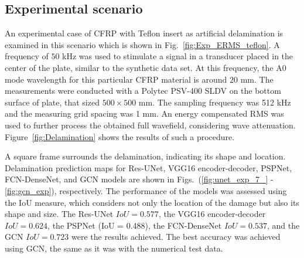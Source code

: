 \subsection{Experimental scenario}
An experimental case of CFRP with Teflon insert as artificial delamination is examined in this scenario which is shown in Fig.~\ref{fig:Exp_ERMS_teflon}.
A frequency of \(50\) kHz was used to stimulate a signal in a transducer placed in the center of the plate, similar to the synthetic data set.
At this frequency, the A0 mode wavelength for this particular CFRP material is around \(20\) mm.
The measurements were conducted with a Polytec PSV-400 SLDV on the bottom surface of plate, that sized \(500 \times 500\) mm.
The sampling frequency was 512 kHz and the measuring grid spacing was 1 mm.
An energy compensated RMS was used to further process the obtained full wavefield, considering wave attenuation.
Figure~\ref{fig:Delamination} shows the results of such a procedure.

A square frame surrounds the delamination, indicating its shape and location.
Delamination prediction maps for Res-UNet, VGG16 encoder-decoder, PSPNet, FCN-DenseNet, and GCN models are shown in Figs.~(\ref{fig:unet_exp_7_} - \ref{fig:gcn_exp}), respectively.
The performance of the models was assessed using the IoU measure, which considers not only the location of the damage but also its shape and size.
The Res-UNet \(IoU = 0.577\), the VGG16 encoder-decoder \(IoU = 0.624\), the PSPNet (IoU = 0.488), the FCN-DenseNet \(IoU = 0.537\), and the GCN \(IoU = 0.723\) were the results achieved.
The best accuracy was achieved using GCN, the same as it was with the numerical test data.

